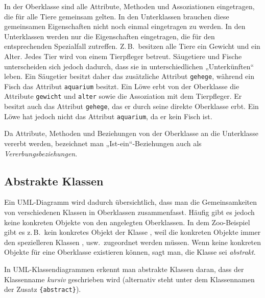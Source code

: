 In der Oberklasse  sind alle Attribute, Methoden und Assoziationen
eingetragen, die für alle Tiere gemeinsam gelten. In den Unterklassen brauchen
diese gemeinsamen Eigenschaften nicht noch einmal eingetragen zu werden. In den
Unterklassen werden nur die Eigenschaften eingetragen, die für den
entsprechenden Spezialfall zutreffen. Z.\,B.\ besitzen alle Tiere ein Gewicht und
ein Alter. Jedes Tier wird von einem Tierpfleger betreut. Säugetiere und Fische
unterscheiden sich jedoch dadurch, dass sie in unterschiedlichen „Unterkünften“
leben. Ein Säugetier besitzt daher das zusätzliche Attribut \lstinline|gehege|, während
ein Fisch das Attribut \lstinline|aquarium| besitzt. Ein Löwe erbt von der Oberklasse
 die Attribute \lstinline|gewicht| und \lstinline|alter| sowie die Assoziation mit dem Tierpfleger.
Er besitzt auch das Attribut \lstinline|gehege|, das er durch seine direkte Oberklasse
 erbt. Ein Löwe hat jedoch nicht das Attribut \lstinline|aquarium|, da er kein
Fisch ist.

Da Attribute, Methoden und Beziehungen von der Oberklasse an die Unterklasse
vererbt werden, bezeichnet man „Ist-ein“-Beziehungen auch als
\emph{Vererbungsbeziehungen}.


\subsection{Abstrakte Klassen}

Ein UML-Diagramm wird dadurch übersichtlich, dass man die Gemeinsamkeiten von
verschiedenen Klassen in Oberklassen zusammenfasst. Häufig gibt es jedoch
keine konkreten Objekte von den angelegten Oberklassen. In dem Zoo-Beispiel
gibt es z.\,B.\ kein konkretes Objekt der Klasse , weil die konkreten Objekte
immer den spezielleren Klassen ,  usw.\ zugeordnet werden
müssen. Wenn keine konkreten Objekte für eine Oberklasse existieren können,
sagt man, die Klasse sei \emph{abstrakt}.

In UML-Klassendiagrammen erkennt man abstrakte Klassen daran, dass der Klassenname
\emph{kursiv} geschrieben wird (alternativ steht unter dem Klassennamen der Zusatz 
\lstinline|{abstract}|).
